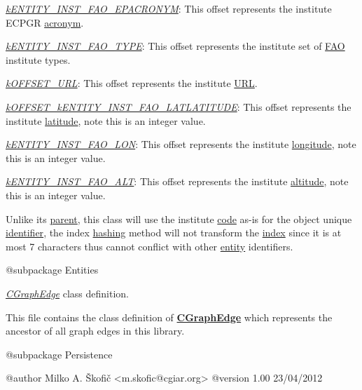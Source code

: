 \begin{DoxyItemize}
\item {\itshape \hyperlink{}{k\-E\-N\-T\-I\-T\-Y\-\_\-\-I\-N\-S\-T\-\_\-\-F\-A\-O\-\_\-\-E\-P\-A\-C\-R\-O\-N\-Y\-M}}\-: This offset represents the institute E\-C\-P\-G\-R \hyperlink{}{acronym}. 
\item {\itshape \hyperlink{}{k\-E\-N\-T\-I\-T\-Y\-\_\-\-I\-N\-S\-T\-\_\-\-F\-A\-O\-\_\-\-T\-Y\-P\-E}}\-: This offset represents the institute set of \hyperlink{}{F\-A\-O} institute types. 
\item {\itshape \hyperlink{}{k\-O\-F\-F\-S\-E\-T\-\_\-\-U\-R\-L}}\-: This offset represents the institute \hyperlink{}{U\-R\-L}. 
\item {\itshape \hyperlink{}{k\-O\-F\-F\-S\-E\-T\-\_\-k\-E\-N\-T\-I\-T\-Y\-\_\-\-I\-N\-S\-T\-\_\-\-F\-A\-O\-\_\-\-L\-A\-T\-L\-A\-T\-I\-T\-U\-D\-E}}\-: This offset represents the institute \hyperlink{}{latitude}, note this is an integer value. 
\item {\itshape \hyperlink{}{k\-E\-N\-T\-I\-T\-Y\-\_\-\-I\-N\-S\-T\-\_\-\-F\-A\-O\-\_\-\-L\-O\-N}}\-: This offset represents the institute \hyperlink{}{longitude}, note this is an integer value. 
\item {\itshape \hyperlink{}{k\-E\-N\-T\-I\-T\-Y\-\_\-\-I\-N\-S\-T\-\_\-\-F\-A\-O\-\_\-\-A\-L\-T}}\-: This offset represents the institute \hyperlink{}{altitude}, note this is an integer value. 
\end{DoxyItemize}

Unlike its \hyperlink{class_c_institute}{parent}, this class will use the institute \hyperlink{}{code} as-\/is for the object unique \hyperlink{}{identifier}, the index \hyperlink{}{hashing} method will not transform the \hyperlink{}{index} since it is at most 7 characters thus cannot conflict with other \hyperlink{class_c_entity}{entity} identifiers.

\begin{DoxyVerb}    @subpackage     Entities\end{DoxyVerb}


{\itshape \hyperlink{class_c_graph_edge}{C\-Graph\-Edge}} class definition.

This file contains the class definition of {\bfseries \hyperlink{class_c_graph_edge}{C\-Graph\-Edge}} which represents the ancestor of all graph edges in this library.

\begin{DoxyVerb}    @subpackage     Persistence

    @author         Milko A. Škofič <m.skofic@cgiar.org>
    @version        1.00 23/04/2012\end{DoxyVerb}


